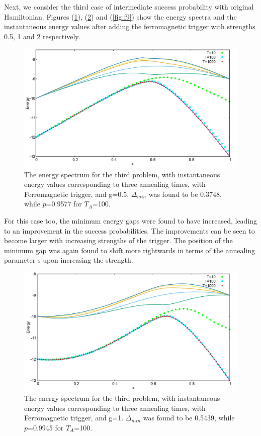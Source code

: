 \documentclass[12]{article}
\begin{document}
Next, we consider the third case of intermediate success probability with original Hamiltonian. Figures (\ref{fig:f7}), (\ref{fig:f8}) and (\ref{fig:f9}) show the energy spectra and the instantaneous energy values after adding the ferromagnetic trigger with strengths 0.5, 1 and 2 respectively.
\begin{figure}[H]
\centering 
\includegraphics[scale=0.3]{528_s12_F_g0.png}
\caption{The energy spectrum for the third problem, with instantaneous energy values corresponding to three annealing times, with Ferromagnetic trigger, and g=0.5. $\Delta_{min}$ was found to be 0.3748, while $p$=0.9577 for $T_A$=100.}
\label{fig:f7}
\end{figure}
For this case too, the minimum energy gaps were found to have increased, leading to an improvement in the success probabilities. The improvements can be seen to become larger with increasing strengths of the trigger. The position of the minimum gap was again found to shift more rightwards in terms of the annealing parameter s upon increasing the strength. \\
\begin{figure}[H]
\centering 
\includegraphics[scale=0.3]{528_s12_F_g1.png}
\caption{The energy spectrum for the third problem, with instantaneous energy values corresponding to three annealing times, with Ferromagnetic trigger, and g=1. $\Delta_{min}$ was found to be 0.5439, while $p$=0.9945 for $T_A$=100.}
\label{fig:f8}
\end{figure}
\end{document}
